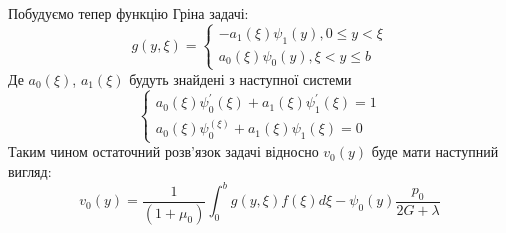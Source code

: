 Побудуємо тепер функцію Гріна задачі:
\begin{equation*}
    g(y, \xi) = \begin{cases}
        -a_1(\xi) \psi_1(y), 0 \le y < \xi \\
        a_0(\xi) \psi_0(y), \xi < y \le b
    \end{cases}
\end{equation*}
Де $a_0(\xi)$, $a_1(\xi)$ будуть знайдені з наступної системи
\begin{equation*}
    \begin{cases}
        a_0(\xi) \psi_0^{'}(\xi) + a_1(\xi) \psi_1^{'}(\xi) = 1 \\
        a_0(\xi) \psi_0^(\xi) + a_1(\xi) \psi_1(\xi) = 0
    \end{cases}
\end{equation*}
Таким чином остаточний розв'язок задачі відносно $v_0(y)$ буде мати наступний вигляд:
\begin{equation*}
    v_0(y) = \frac{1}{(1+\mu_0)} \int_{0}^{b}g(y,\xi) f(\xi) d\xi - \psi_0(y) \frac{p_0}{2G + \lambda}
\end{equation*}

